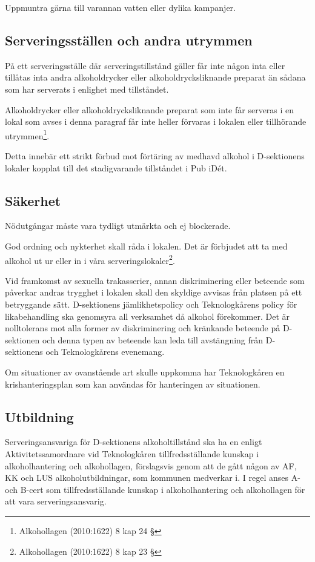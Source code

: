 \documentclass[]{dsekprotokoll}
\begin{document}
Uppmuntra gärna till varannan vatten eller dylika kampanjer.

\subsection{Serveringsställen och andra utrymmen}
På ett serveringsställe där serveringstillstånd gäller får inte någon inta eller tillåtas inta andra
alkoholdrycker eller alkoholdrycksliknande preparat än sådana som har serverats i enlighet
med tillståndet.

Alkoholdrycker eller alkoholdrycksliknande preparat som inte får serveras i en lokal som
avses i denna paragraf får inte heller förvaras i lokalen eller tillhörande utrymmen\footnote{Alkohollagen (2010:1622) 8 kap 24 §}.

Detta innebär ett strikt förbud mot förtäring av medhavd alkohol i D-sektionens lokaler
kopplat till det stadigvarande tillståndet i Pub iDét.

\subsection{Säkerhet}
Nödutgångar måste vara tydligt utmärkta och ej blockerade.

God ordning och nykterhet skall råda i lokalen. Det är förbjudet att ta med alkohol ut ur eller in i våra serveringslokaler\footnote{Alkohollagen (2010:1622) 8 kap 23 §}.

Vid framkomst av sexuella trakasserier, annan diskriminering eller beteende som påverkar
andras trygghet i lokalen skall den skyldige avvisas från platsen på ett betryggande sätt.
D-sektionens jämlikhetspolicy och Teknologkårens policy för likabehandling ska genomsyra all verksamhet då alkohol förekommer. Det är nolltolerans mot alla former av diskriminering och kränkande beteende på D-sektionen och denna typen av beteende kan leda till avstängning från
D-sektionens och Teknologkårens evenemang.

Om situationer av ovanstående art skulle uppkomma har Teknologkåren en krishanteringsplan som kan användas för hanteringen av situationen.

\subsection{Utbildning}
Serveringsansvariga för D-sektionens alkoholtillstånd ska ha en enligt Aktivitetssamordnare vid Teknologkåren tillfredsställande kunskap i alkoholhantering och alkohollagen, förslagsvis genom att de gått någon av AF, KK och LUS alkoholutbildningar, som kommunen medverkar i. I regel anses A- och B-cert som tillfredsställande kunskap i alkoholhantering och alkohollagen för att vara serveringsansvarig.
\end{document}

